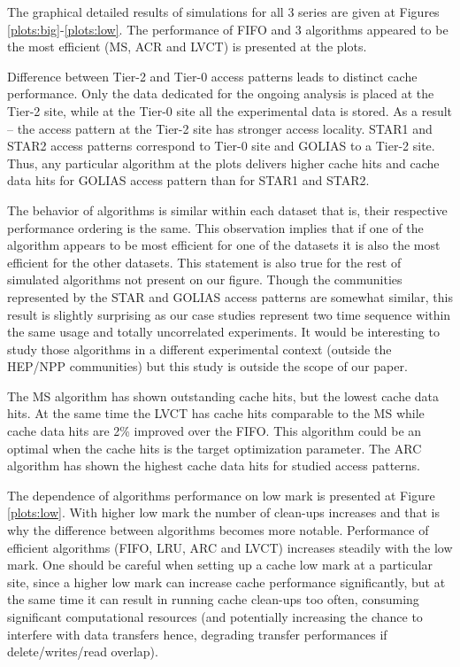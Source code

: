\documentclass[english]{ddny}
\begin{document}
The graphical detailed results of simulations for all 3 series are given at Figures \ref{plots:big}-\ref{plots:low}. The performance of FIFO and 3 algorithms appeared to be the most efficient (MS, ACR and LVCT) is presented at the plots. 

Difference between Tier-2 and Tier-0 access patterns leads to distinct cache performance. Only the data dedicated for the ongoing analysis is placed at the Tier-2 site, while at the Tier-0 site all the experimental data is stored. As a result -- the access pattern at the Tier-2 site has stronger access locality. STAR1 and STAR2 access patterns correspond to Tier-0 site and GOLIAS to a Tier-2 site.  Thus, any particular algorithm at the plots delivers higher cache hits and cache data hits for GOLIAS access pattern than for STAR1 and STAR2.  


The behavior of algorithms is similar within each dataset that is, their respective performance ordering is the same. This observation implies that if one of the algorithm appears to be most efficient for one of the datasets it is also the most efficient for the other datasets. This statement is also true for the rest of simulated algorithms not present on our figure. Though the communities represented by the STAR and GOLIAS access patterns are somewhat similar, this result is slightly surprising as our case studies represent two time sequence within the same usage and totally uncorrelated experiments. It would be interesting to study those algorithms in a different experimental context (outside the HEP/NPP communities) but this study is outside the scope of our paper. 

The MS algorithm has shown outstanding cache hits, but the lowest cache data hits. At the same time the LVCT has cache hits comparable to the MS while cache data hits are 2\% improved over the FIFO. This algorithm could be an optimal when the cache hits is the target optimization parameter. The ARC algorithm has shown the highest cache data hits for studied access patterns.

The dependence of algorithms performance on low mark is presented at Figure \ref{plots:low}. With higher low mark the number of clean-ups increases and that is why the difference between algorithms becomes more notable. Performance of efficient algorithms (FIFO, LRU, ARC and LVCT) increases steadily with the low mark. One should be careful when setting up a cache low mark at a particular site, since a higher low mark can increase cache performance significantly, but at the same time it can result in running cache clean-ups too often, consuming significant computational resources (and potentially increasing the chance to interfere with data transfers hence, degrading transfer performances if delete/writes/read overlap).
\end{document}
